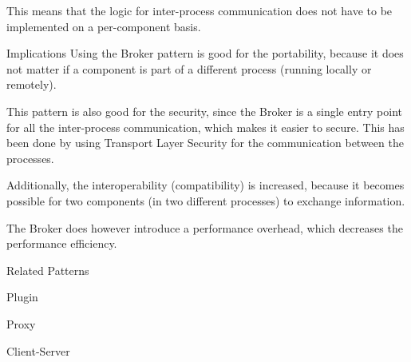 \begin{patdescription}
This means that the logic for inter-process communication does not have to be implemented on a per-component basis.

\item [Implications]
Using the Broker pattern is good for the portability, because it does not matter if a component is part of a different process (running locally or remotely).

This pattern is also good for the security, since the Broker is a single entry point for all the inter-process communication, which makes it easier to secure. This has been done by using Transport Layer Security for the communication between the processes.

Additionally, the interoperability (compatibility) is increased, because it becomes possible for two components (in two different processes) to exchange information. 

The Broker does however introduce a performance overhead, which decreases the performance efficiency.



\item [Related Patterns]
\begin{mynesteditemlist}
\item Plugin
\item Proxy
\item Client-Server
\end{mynesteditemlist}

\end{patdescription}
